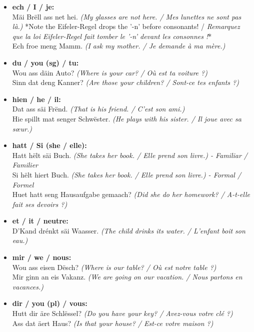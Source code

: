 \begin{itemize}
    \item \textbf{ech / I / je:} \\
    Mäi Brëll ass net hei. \textit{(My glasses are not here. / Mes lunettes ne sont pas là.)} *Note the Eifeler-Regel drops the '-n' before consonants! / \textit{Remarquez que la loi Eifeler-Regel fait tomber le '-n' devant les consonnes !}* \\
    Ech froe meng Mamm. \textit{(I ask my mother. / Je demande à ma mère.)}
    
    \item \textbf{du / you (sg) / tu:} \\
    Wou ass däin Auto? \textit{(Where is your car? / Où est ta voiture ?)} \\
    Sinn dat deng Kanner? \textit{(Are those your children? / Sont-ce tes enfants ?)}
    
    \item \textbf{hien / he / il:} \\
    Dat ass säi Frënd. \textit{(That is his friend. / C'est son ami.)} \\
    Hie spillt mat senger Schwëster. \textit{(He plays with his sister. / Il joue avec sa sœur.)}
    
    \item \textbf{hatt / Si (she / elle):} \\
    Hatt hëlt säi Buch. \textit{(She takes her book. / Elle prend son livre.) - Familiar / Familier} \\
    Si hëlt hiert Buch. \textit{(She takes her book. / Elle prend son livre.) - Formal / Formel} \\
    Huet hatt seng Hausaufgabe gemaach? \textit{(Did she do her homework? / A-t-elle fait ses devoirs ?)}
    
    \item \textbf{et / it / neutre:} \\
    D'Kand drénkt säi Waasser. \textit{(The child drinks its water. / L'enfant boit son eau.)}
    
    \item \textbf{mir / we / nous:} \\
    Wou ass eisen Dësch? \textit{(Where is our table? / Où est notre table ?)} \\
    Mir ginn an eis Vakanz. \textit{(We are going on our vacation. / Nous partons en vacances.)}
    
    \item \textbf{dir / you (pl) / vous:} \\
    Hutt dir äre Schlëssel? \textit{(Do you have your key? / Avez-vous votre clé ?)} \\
    Ass dat äert Haus? \textit{(Is that your house? / Est-ce votre maison ?)}
    

\end{itemize}
